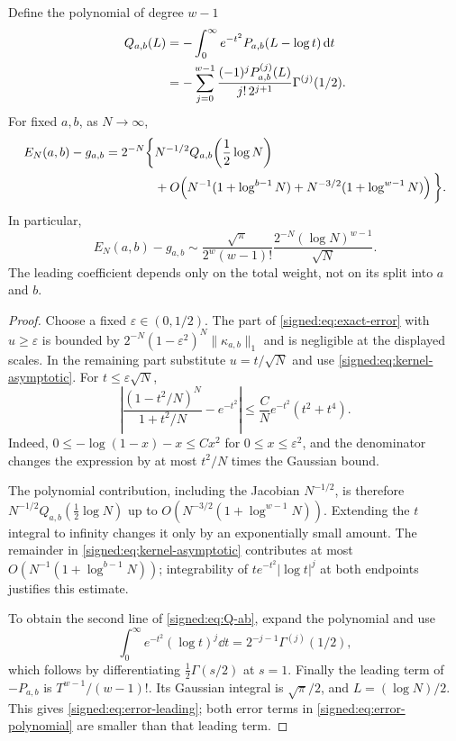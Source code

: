 \begin{theorem}\label{signed:thm:error-polynomial}
Define the polynomial of degree $w-1$
\begin{align}\label{signed:eq:Q-ab}
 Q_{a,b}(L)
 &=-\int_0^\infty e^{-t^2}P_{a,b}(L-\log t)\,\mathrm d t\notag\\
 &=-\sum_{j=0}^{w-1}\frac{(-1)^jP_{a,b}^{(j)}(L)}{j!\,2^{j+1}}
       \Gamma^{(j)}(1/2).
\end{align}
For fixed $a,b$, as $N\to\infty$,
\begin{align}\label{signed:eq:error-polynomial}
 E_N(a,b)-g_{a,b}=2^{-N}\bigg\{&N^{-1/2}Q_{a,b}\!\left(\frac12\log N\right)\notag\\
 &+O\!\left(N^{-1}(1+\log^{b-1}N)
       +N^{-3/2}(1+\log^{w-1}N)\right)\bigg\}.
\end{align}
In particular,
\begin{equation}\label{signed:eq:error-leading}
 E_N(a,b)-g_{a,b}\sim
 \frac{\sqrt\pi}{2^w(w-1)!}
 \frac{2^{-N}(\log N)^{w-1}}{\sqrt N}.
\end{equation}
The leading coefficient depends only on the total weight, not on its split into $a$ and $b$.
\end{theorem}
\begin{proof}
Choose a fixed $\varepsilon\in(0,1/2)$. The part of \eqref{signed:eq:exact-error} with $u\ge\varepsilon$ is bounded by
$2^{-N}(1-\varepsilon^2)^N\|\kappa_{a,b}\|_1$ and is negligible at the displayed scales. In the remaining part substitute $u=t/\sqrt N$ and use \eqref{signed:eq:kernel-asymptotic}. For $t\le\varepsilon\sqrt N$,
\[
 \left|\frac{(1-t^2/N)^N}{1+t^2/N}-e^{-t^2}\right|
 \le\frac{C}{N}e^{-t^2}(t^2+t^4).
\]
Indeed, $0\le-\log(1-x)-x\le Cx^2$ for $0\le x\le\varepsilon^2$, and the denominator changes the expression by at most $t^2/N$ times the Gaussian bound.

The polynomial contribution, including the Jacobian $N^{-1/2}$, is therefore
$N^{-1/2}Q_{a,b}(\tfrac12\log N)$ up to
$O(N^{-3/2}(1+\log^{w-1}N))$. Extending the $t$ integral to infinity changes it only by an exponentially small amount. The remainder in \eqref{signed:eq:kernel-asymptotic} contributes at most
$O(N^{-1}(1+\log^{b-1}N))$; integrability of $t e^{-t^2}|\log t|^j$ at both endpoints justifies this estimate.

To obtain the second line of \eqref{signed:eq:Q-ab}, expand the polynomial and use
\[
 \int_0^\infty e^{-t^2}(\log t)^j\dd t
 =2^{-j-1}\Gamma^{(j)}(1/2),
\]
which follows by differentiating $\tfrac12\Gamma(s/2)$ at $s=1$. Finally the leading term of $-P_{a,b}$ is $T^{w-1}/(w-1)!$. Its Gaussian integral is $\sqrt\pi/2$, and $L=(\log N)/2$. This gives \eqref{signed:eq:error-leading}; both error terms in \eqref{signed:eq:error-polynomial} are smaller than that leading term.
\end{proof}

